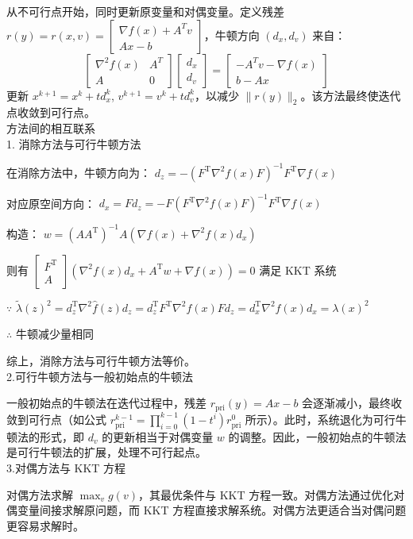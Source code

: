 \documentclass{article}
\newenvironment{solution_cn}{%
  \begin{proof}[解答]%
  \kaishu  %
}{%
  \end{proof}%
}
\begin{document}
\begin{solution_cn}
从不可行点开始，同时更新原变量和对偶变量。定义残差 \(r(y) = r(x, v) = \begin{bmatrix} \nabla f(x) + A^T v \\ Ax - b \end{bmatrix}\)，牛顿方向 \((d_x, d_v)\) 来自：
\[
\begin{bmatrix}
\nabla^2 f(x) & A^T \\
A & 0
\end{bmatrix}
\begin{bmatrix}
d_x \\
d_v
\end{bmatrix}
=
\begin{bmatrix}
-A^T v - \nabla f(x) \\
b - Ax
\end{bmatrix}
\]
更新 \(x^{k+1} = x^k + t d_x^k\), \(v^{k+1} = v^k + t d_v^k\)，以减少 \(\| r(y) \|_2\)。该方法最终使迭代点收敛到可行点。\\
方法间的相互联系\\
1. 消除方法与可行牛顿方法

在消除方法中，牛顿方向为：
$d_z = -\left(F^{\mathrm{T}} \nabla^2 f(x) F\right)^{-1} F^{\mathrm{T}} \nabla f(x)$

对应原空间方向：
$d_x = F d_z = -F \left(F^{\mathrm{T}} \nabla^2 f(x) F\right)^{-1} F^{\mathrm{T}} \nabla f(x)$

构造：
$w = \left(A A^{\mathrm{T}}\right)^{-1} A \left(\nabla f(x) + \nabla^2 f(x) d_x\right)$

则有
$\begin{bmatrix}
F^{\mathrm{T}} \\
A
\end{bmatrix}
\left(\nabla^2 f(x) d_x + A^{\mathrm{T}} w + \nabla f(x)\right) = 0$
满足 KKT 系统

$\because$
$\tilde{\lambda}(z)^2 = d_z^{\mathrm{T}} \nabla^2 \hat{f}(z) d_z = d_z^{\mathrm{T}} F^{\mathrm{T}} \nabla^2 f(x) F d_z = d_x^{\mathrm{T}} \nabla^2 f(x) d_x = \lambda(x)^2$

$\therefore$ 牛顿减少量相同

综上，消除方法与可行牛顿方法等价。\\
2.可行牛顿方法与一般初始点的牛顿法

一般初始点的牛顿法在迭代过程中，残差 \(r_{\text{pri}}(y) = Ax - b\) 会逐渐减小，最终收敛到可行点（如公式 \(r_{\text{pri}}^{k-1} = \prod_{i=0}^{k-1} (1 - t^i) r_{\text{pri}}^0\) 所示）。此时，系统退化为可行牛顿法的形式，即 \(d_v\) 的更新相当于对偶变量 \(w\) 的调整。因此，一般初始点的牛顿法是可行牛顿法的扩展，处理不可行起点。\\
3.对偶方法与 KKT 方程

对偶方法求解 \(\max_v g(v)\)，其最优条件与 KKT 方程一致。对偶方法通过优化对偶变量间接求解原问题，而 KKT 方程直接求解系统。对偶方法更适合当对偶问题更容易求解时。 
\end{solution_cn}
\end{document}
